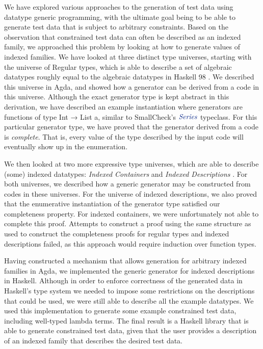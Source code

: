 \documentclass[a4paper,msc,twosized=semi]{uustthesis}
\let\oldemph\emph
\renewcommand\emph[1]{{\large\oldemph{#1}}}
\newcommand{\agda}[1]{{\agdafontinline\color{agdacolor}#1}}
\newcommand*{\mathcolor}{}
\def\mathcolor#1#{\mathcoloraux{#1}}
\newcommand*{\mathcoloraux}[3]{%
  \protect\leavevmode
  \begingroup
    \color#1{#2}#3%
  \endgroup
}
\newcommand{\HSCon}[1]{\mathcolor{hsblue3}{\mathit{#1}}}
\begin{document}
  We have explored various approaches to the generation of test data 
  using datatype generic programming, with the ultimate goal being to be able to 
  generate test data that is subject to arbitrary constraints. Based on the observation that constrained test 
  data can often be described as an indexed family, we approached this problem by 
  looking at how to generate values of indexed families. We have looked at three 
  distinct type universes, starting with the universe of Regular types, which is able 
  to describe a set of algebraic datatypes roughly equal to the algebraic datatypes in 
  Haskell 98 \cite{jones2003haskell}. We described this universe in Agda, and showed 
  how a generator can be derived from a code in this universe. Although the exact 
  generator type is kept abstract in this derivation, we have described an example 
  instantiation where generators are functions of type \agda{Int → List a}, similar to 
  SmallCheck's \ensuremath{\HSCon{Series}} \cite{runciman2008smallcheck} typeclass. For this particular generator 
  type, we have proved that the generator derived from a code is \emph{complete}. That 
  is, every value of the type described by the input code will eventually show up in 
  the enumeration. 

  We then looked at two more expressive type universes, which are able to describe 
  (some) indexed datatypes: \emph{Indexed Containers} \cite{altenkirch2015indexed} and 
  \emph{Indexed Descriptions} \cite{dagand2013cosmology}. For both universes, we 
  described how a generic generator may be constructed from codes in these universes. 
  For the universe of indexed descriptions, we also proved that the enumerative 
  instantiation of the generator type satisfied our completeness property. For indexed 
  containers, we were unfortunately not able to complete this proof. Attempts to 
  construct a proof using the same structure as used to construct the completeness 
  proofs for regular types and indexed descriptions failed, as this approach would 
  require induction over function types. 

  Having constructed a mechanism that allows generation for arbitrary indexed families 
  in Agda, we implemented the generic generator for indexed descriptions in Haskell. 
  Although in order to enforce correctness of the generated data in Haskell's type 
  system we needed to impose some restrictions on the descriptions that could be used, 
  we were still able to describe all the example datatypes. We used this 
  implementation to generate some example constrained test data, including well-typed 
  lambda terms. The final result is a Haskell library that is able to generate 
  constrained test data, given that the user provides a description of an indexed 
  family that describes the desired test data. 
\end{document}
